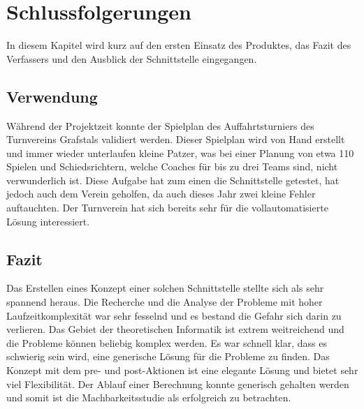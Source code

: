%
%


\chapter{Schlussfolgerungen}\label{chap.Schlussfolgerungen}
In diesem Kapitel wird kurz auf den ersten Einsatz des Produktes, das Fazit des Verfassers und den Ausblick der Schnittstelle eingegangen.

\section{Verwendung}\label{fazit_verwendung}
Während der Projektzeit konnte der Spielplan des Auffahrtsturniers des Turnvereins Grafstals validiert werden. Dieser Spielplan wird von Hand erstellt und immer wieder unterlaufen 
kleine Patzer, was bei einer Planung von etwa 110 Spielen und Schiedsrichtern, welche Coaches für bis zu drei Teams sind, nicht verwunderlich ist. Diese Aufgabe hat zum einen die Schnittstelle 
getestet, hat jedoch auch dem Verein geholfen, da auch dieses Jahr zwei kleine Fehler auftauchten. Der Turnverein hat sich bereits sehr für die vollautomatisierte Lösung interessiert.

\section{Fazit}\label{fazit}

Das Erstellen eines Konzept einer solchen Schnittstelle stellte sich als sehr spannend heraus. Die Recherche und die Analyse der Probleme mit hoher Laufzeitkomplexität war sehr fesselnd und es 
bestand die Gefahr sich darin zu verlieren. Das Gebiet der theoretischen Informatik ist extrem weitreichend und die Probleme können beliebig komplex werden. Es war schnell klar, dass es schwierig 
sein wird, eine generische Lösung für die Probleme zu finden. Das Konzept mit dem pre- und post-Aktionen ist eine elegante Lösung und bietet sehr viel Flexibilität. Der Ablauf einer Berechnung 
konnte generisch gehalten werden und somit ist die Machbarkeitsstudie als erfolgreich zu betrachten.

